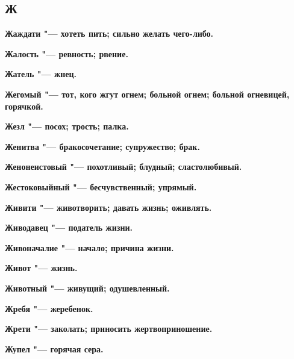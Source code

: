 \begin{mymulticols}{2}
\section{Ж} 





\bfseries Жаждати\normalfont{} "--- хотеть пить; сильно желать чего-либо. 




\bfseries Жалость\normalfont{} "--- ревность; рвение. 




\bfseries Жатель\normalfont{} "--- жнец. 




\bfseries Жегомый\normalfont{} "--- тот, кого жгут огнем; больной огнем; больной огневицей, горячкой. 




\bfseries Жезл\normalfont{} "--- посох; трость; палка. 




\bfseries Женитва\normalfont{} "--- бракосочетание; супружество; брак. 




\bfseries Женонеистовый\normalfont{} "--- похотливый; блудный; сластолюбивый. 




\bfseries Жестоковыйный\normalfont{} "--- бесчувственный; упрямый. 




\bfseries Живити\normalfont{} "--- животворить; давать жизнь; оживлять. 




\bfseries Живодавец\normalfont{} "--- податель жизни. 




\bfseries Живоначалие\normalfont{} "--- начало; причина жизни. 




\bfseries Живот\normalfont{} "--- жизнь. 




\bfseries Животный\normalfont{} "--- живущий; одушевленный. 




\bfseries Жребя\normalfont{} "--- жеребенок. 




\bfseries Жрети\normalfont{} "--- заколать; приносить жертвоприношение. 




\bfseries Жупел\normalfont{} "--- горячая сера. 





\end{mymulticols}
